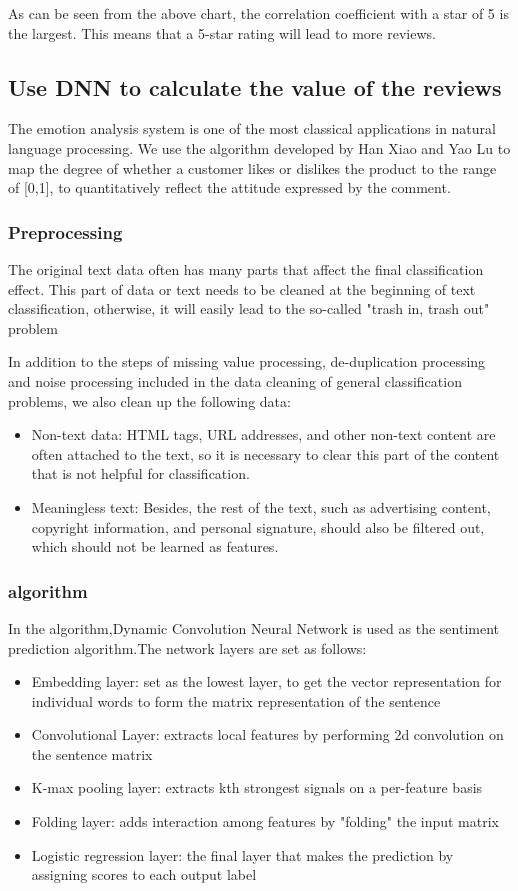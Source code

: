 \documentclass{mcmthesis}
\begin{document}
As can be seen from the above chart, the correlation coefficient with a star of 5 is the largest. This means that a 5-star rating will lead to more reviews.

\subsection{Use DNN to calculate the value of the reviews}
The emotion analysis system is one of the most classical applications in natural language processing. We use the algorithm developed by Han Xiao and Yao Lu\cite{1} to map the degree of whether a customer likes or dislikes the product to the range of [0,1], to quantitatively reflect the attitude expressed by the comment.
\subsubsection{Preprocessing}


The original text data often has many parts that affect the final classification effect. This part of data or text needs to be cleaned at the beginning of text classification, otherwise, it will easily lead to the so-called "trash in, trash out" problem\cite{2}

In addition to the steps of missing value processing, de-duplication processing and noise processing included in the data cleaning of general classification problems, we also clean up the following data:
\begin{itemize}
	\item Non-text data: HTML tags, URL addresses, and other non-text content are often attached to the text, so it is necessary to clear this part of the content that is not helpful for classification.
	\item Meaningless text: Besides, the rest of the text, such as advertising content, copyright information, and personal signature, should also be filtered out, which should not be learned as features.
\end{itemize}
\subsubsection{algorithm}
In the algorithm,Dynamic Convolution Neural Network is used as the sentiment prediction algorithm.The network layers are set as follows:
\begin{itemize}
	\item Embedding layer: set as the lowest layer, to get the vector representation for individual words to form the matrix representation of the sentence
	\item Convolutional Layer: extracts local features by performing 2d convolution on the sentence matrix
	\item K-max pooling layer: extracts kth strongest signals on a per-feature basis
	\item Folding layer: adds interaction among features by "folding" the input matrix
	\item Logistic regression layer: the final layer that makes the prediction by assigning scores to each output label
\end{itemize}
\end{document}
